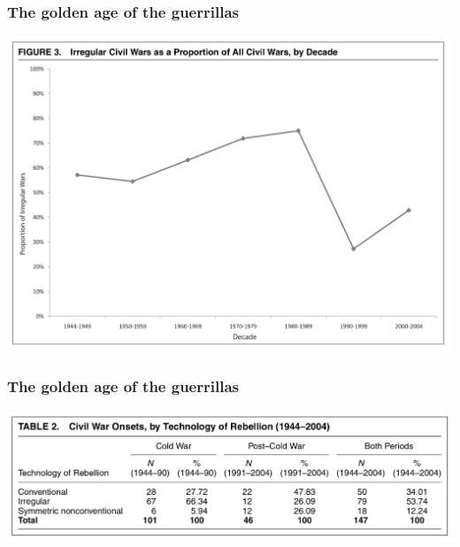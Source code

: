 \documentclass[aspectratio=43]{beamer}
\begin{document}
\begin{frame}
\frametitle{The golden age of the guerrillas}
\centering

\includegraphics[width = \textwidth]{img/kalyvas_balcells_irr}

\end{frame}

\begin{frame}
\frametitle{The golden age of the guerrillas}
\centering

\includegraphics[width = \textwidth]{img/kalyvas_balcells_table}

\end{frame}
\end{document}
